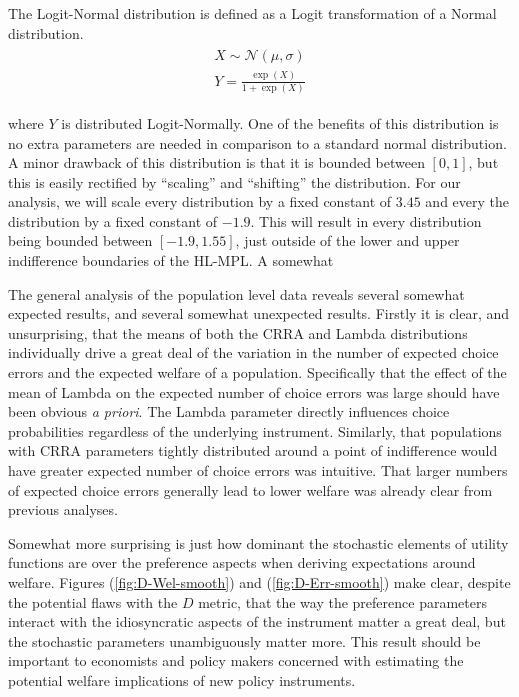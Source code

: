 \documentclass[../main.tex]{subfiles}
\begin{document}
The Logit-Normal distribution is defined as a Logit transformation of a Normal distribution.
\begin{align}
	\begin{split}
		X \sim \mathcal{N}(\mu,\sigma)\\
		Y = \frac{\exp(X)}{1 + \exp(X)}
	\end{split}
\end{align}

\noindent where $Y$ is distributed Logit-Normally.
One of the benefits of this distribution is no extra parameters are needed in comparison to a standard normal distribution.
A minor drawback of this distribution is that it is bounded between $[0,1]$, but this is easily rectified by \enquote{scaling} and \enquote{shifting} the distribution.
For our analysis, we will scale every distribution by a fixed constant of $3.45$ and every the distribution by a fixed constant of $-1.9$.
This will result in every distribution being bounded between $[-1.9,1.55]$, just outside of the lower and upper indifference boundaries of the HL-MPL.
A somewhat 




The general analysis of the population level data reveals several somewhat expected results, and several somewhat unexpected results.
Firstly it is clear, and unsurprising, that the means of both the CRRA and Lambda distributions individually drive a great deal of the variation in the number of expected choice errors and the expected welfare of a population.
Specifically that the effect of the mean of Lambda on the expected number of choice errors was large should have been obvious \textit{a priori}.
The Lambda parameter directly influences choice probabilities regardless of the underlying instrument.
Similarly, that populations with CRRA parameters tightly distributed around a point of indifference would have greater expected number of choice errors was intuitive.
That larger numbers of expected choice errors generally lead to lower welfare was already clear from previous analyses.

Somewhat more surprising is just how dominant the stochastic elements of utility functions are over the preference aspects when deriving expectations around welfare.
Figures (\ref{fig:D-Wel-smooth}) and (\ref{fig:D-Err-smooth}) make clear, despite the potential flaws with the $D$ metric, that the way the preference parameters interact with the idiosyncratic aspects of the instrument matter a great deal, but the stochastic parameters unambiguously matter more.
This result should be important to economists and policy makers concerned with estimating the potential welfare implications of new policy instruments.
\end{document}
